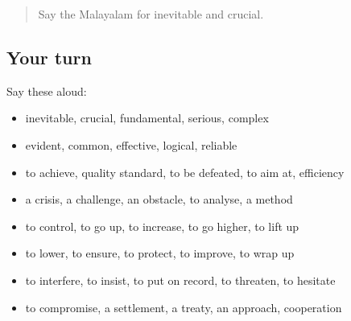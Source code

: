 \label{lesson:ML-R452-review-445-452}



\begin{quote}
Say the Malayalam for inevitable and crucial.
\end{quote}

\subsection*{Your turn}
Say these aloud:

\begin{itemize}
\raggedright
  \item inevitable, crucial, fundamental, serious, complex
  \item evident, common, effective, logical, reliable
  \item to achieve, quality standard, to be defeated, to aim at, efficiency
  \item a crisis, a challenge, an obstacle, to analyse, a method
  \item to control, to go up, to increase, to go higher, to lift up
  \item to lower, to ensure, to protect, to improve, to wrap up
  \item to interfere, to insist, to put on record, to threaten, to hesitate
  \item to compromise, a settlement, a treaty, an approach, cooperation
\end{itemize}

